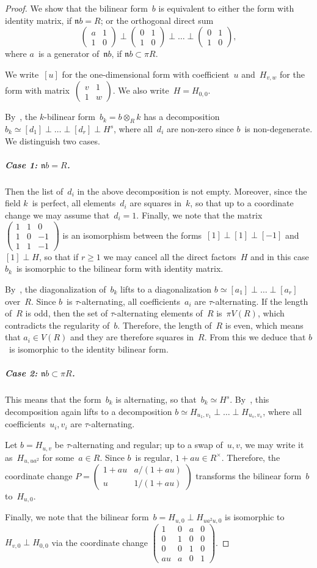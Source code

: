 \documentclass{article}%
\let\fr\mathfrak
\def\mat#1{\begin{pmatrix}#1\end{pmatrix}}
\begin{document}
\begin{proof}
We show that the bilinear form~$b$ is equivalent to either the form with
identity matrix, if $\fr n b = R$; or the orthogonal direct sum
\[ \mat{a & 1\\1&0} ⟂ \mat{0 & 1\\1&0} ⟂ … ⟂ \mat {0 & 1\\ 1 & 0}, \]
where $a$~is a generator of~$\fr n b$, if $\fr n b ⊂ π R$.

We write~$[u]$ for the one-dimensional form with coefficient~$u$
and~$H_{v, w}$ for the form with matrix~$\mat{v&1\\1&w}$.
We also write~$H = H_{0,0}$.

By~\cite[§2]{milnor2}, the $k$-bilinear form~$b_k = b ⊗_R k$ has a
decomposition~$b_k ≃ [d_1] ⟂ … ⟂ [d_r] ⟂ H^s$, where all~$d_i$ are
non-zero since $b$~is non-degenerate. We distinguish two cases.

\subparagraph{Case 1: $\fr n b = R$.}
Then the list of~$d_i$ in the above
decomposition is not empty. Moreover, since the field $k$~is perfect, all
elements~$d_i$ are squares in~$k$, so that up to a coordinate change we
may assume that~$d_i = 1$. Finally, we note that the
matrix~$\mat{1&1&0\\1&0&-1\\1&1&-1}$ is an isomorphism between the
forms~$[1] ⟂ [1] ⟂ [-1]$ and~$[1] ⟂ H$, so that if $r ≥ 1$ we may cancel
all the direct factors~$H$ and in this case $b_k$~is isomorphic to the
bilinear form with identity matrix.

By~\cite[Corollary 3.4]{baeza1978quadratic},
the diagonalization of~$b_k$ lifts to a diagonalization
$b ≃ [a_1] ⟂ … ⟂ [a_r]$ over~$R$.
Since $b$~is $τ$-alternating, all coefficients~$a_i$ are $τ$-alternating.
If the length of~$R$ is odd, then the set of $τ$-alternating elements of~$R$
is~$π V(R)$, which contradicts the regularity of~$b$.
Therefore, the length of~$R$ is even, which means that $a_i ∈ V(R)$ and they are
therefore squares in~$R$.
From this we deduce that $b$~is isomorphic to the identity bilinear form.

\subparagraph{Case 2: $\fr n b ⊂ π R$.}
This means that the form~$b_k$ is alternating, so that~$b_k ≃ H^s$.
By~\cite[Corollary 3.4]{baeza1978quadratic}, this decomposition again lifts to a
decomposition $b ≃ H_{u_1, v_1} ⟂ … ⟂ H_{u_s, v_s}$, where all
coefficients~$u_i, v_i$ are $τ$-alternating.

Let $b = H_{u,v}$ be $τ$-alternating and regular; up to a swap of~$u, v$, we
may write it as~$H_{u, u a^2}$ for some~$a ∈ R$. Since $b$~is
regular, $1 + a u ∈ R^{×}$. Therefore, the coordinate
change $P = \mat{1+a u & a/(1+a u) \\ u & 1/(1+a u)}$ transforms the
bilinear form~$b$ to~$H_{u, 0}$.

Finally, we note that the bilinear form~$b = H_{u, 0} ⟂ H_{u a^2 u, 0}$ is
isomorphic to~$H_{v, 0} ⟂ H_{0,0}$ via the coordinate change
$\mat{1 & 0 & a & 0\\0&1&0&0\\0&0&1&0\\au & a & 0 & 1}$.
\end{proof}
\end{document}
